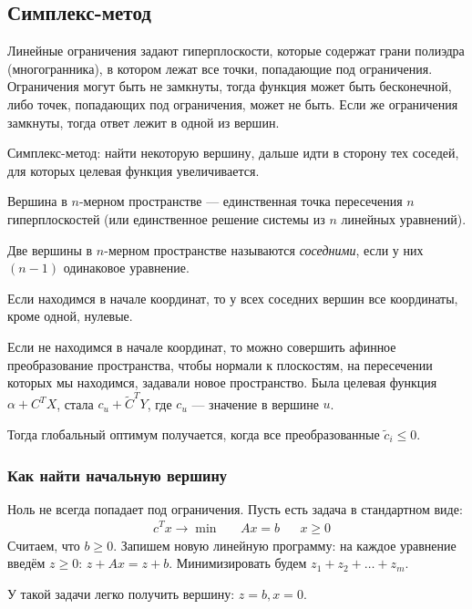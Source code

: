 \subsection{Симплекс-метод}
Линейные ограничения задают гиперплоскости,
которые содержат грани полиэдра (многогранника),
в котором лежат все точки, попадающие под ограничения.
Ограничения могут быть не замкнуты,
тогда функция может быть бесконечной,
либо точек, попадающих под ограничения,
может не быть.
Если же ограничения замкнуты,
тогда ответ лежит в одной из вершин.

Симплекс-метод:
найти некоторую вершину,
дальше идти в сторону тех соседей,
для которых целевая функция увеличивается.

\begin{definition}
    Вершина в $n$-мерном пространстве
    --- единственная точка пересечения $n$ гиперплоскостей
    (или единственное решение системы из $n$ линейных уравнений).
\end{definition}
\begin{definition}
    Две вершины в $n$-мерном пространстве называются \emph{соседними},
    если у них $(n - 1)$ одинаковое уравнение.
\end{definition}

Если находимся в начале координат,
то у всех соседних вершин все координаты,
кроме одной, нулевые.

Если не находимся в начале координат,
то можно совершить афинное преобразование пространства,
чтобы нормали к плоскостям,
на пересечении которых мы находимся,
задавали новое пространство.
Была целевая функция
$\alpha + C^T X$, стала $c_u + \tilde{C}^T Y$,
где $c_u$ --- значение в вершине $u$.

Тогда глобальный оптимум получается,
когда все преобразованные $\tilde{c}_i \le 0$.

\subsubsection{Как найти начальную вершину}
Ноль не всегда попадает под ограничения.
Пусть есть задача в стандартном виде:
\begin{align*}
    & c^T x \to \min
    && Ax = b
    && x \ge 0
\end{align*}
Считаем, что $b \ge 0$.
Запишем новую линейную программу:
на каждое уравнение введём $z \ge 0$:
$z + Ax = z + b$.
Минимизировать будем
$z_1 + z_2 + \ldots + z_m$.

У такой задачи легко получить
вершину: $z = b, x = 0$.

